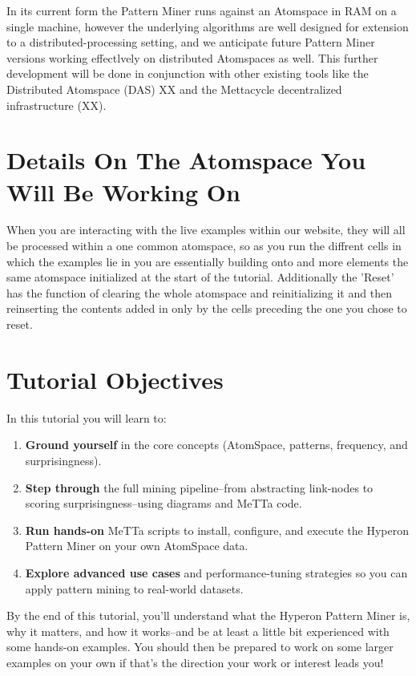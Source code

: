 \documentclass{article}
\begin{document}
In its current form the Pattern Miner runs against an Atomspace in RAM on a single machine, however the underlying algorithms are well designed for extension to a distributed-processing setting, and we anticipate future Pattern Miner versions working effectlvely on distributed Atomspaces as well.   This further development will be done in conjunction with other existing tools like the Distributed Atomspace (DAS) XX and the Mettacycle decentralized infrastructure (XX).

\section{Details On The Atomspace You Will Be Working On}

When you are interacting with the live examples within our website, they will all be processed within a one common atomspace, so as you run the diffrent cells in which the examples lie in you are essentially building onto and more elements the same atomspace initialized at the start of the tutorial. Additionally the 'Reset' has the function of clearing the whole atomspace and reinitializing it and then reinserting the contents added in only by the cells preceding the one you chose to reset.

\section{Tutorial Objectives}

In this tutorial you will learn to:

\begin{enumerate}
  \item \textbf{Ground yourself} in the core concepts (AtomSpace, patterns, frequency, and surprisingness).
  \item \textbf{Step through} the full mining pipeline--from abstracting link-nodes to scoring surprisingness--using diagrams and MeTTa code.
  \item \textbf{Run hands-on} MeTTa scripts to install, configure, and execute the Hyperon Pattern Miner on your own AtomSpace data.
  \item \textbf{Explore advanced use cases} and performance-tuning strategies so you can apply pattern mining to real-world datasets.
\end{enumerate}

By the end of this tutorial, you'll understand what the Hyperon Pattern Miner is, why it matters, and how it works--and be at least a little bit experienced with some hands-on examples.   You should then be prepared to work on some larger examples on your own if that's the direction your work or interest leads you!
\end{document}
